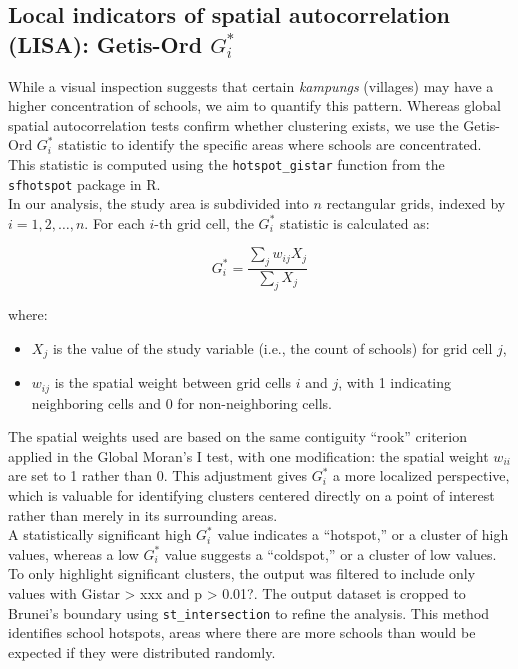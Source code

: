 \documentclass[12pt]{article}
\begin{document}
\subsection{Local indicators of spatial autocorrelation (LISA): Getis-Ord \( G_i^* \)}
While a visual inspection suggests that certain \textit{kampungs} (villages) may have a higher concentration of schools, we aim to quantify this pattern. Whereas global spatial autocorrelation tests confirm whether clustering exists, we use the Getis-Ord \( G_i^* \) statistic to identify the specific areas where schools are concentrated. This statistic is computed using the \texttt{hotspot\_gistar} function from the \texttt{sfhotspot} package in R. \\

In our analysis, the study area is subdivided into \( n \) rectangular grids, indexed by \( i = 1, 2, \dots, n \). For each \( i \)-th grid cell, the \( G_i^* \) statistic is calculated as:

\begin{equation}
G_i^* = \frac{\sum_j w_{ij} X_j}{\sum_j X_j}
\end{equation}

where:
\begin{itemize}
    \item \( X_j \) is the value of the study variable (i.e., the count of schools) for grid cell \( j \),
    \item \( w_{ij} \) is the spatial weight between grid cells \( i \) and \( j \), with 1 indicating neighboring cells and 0 for non-neighboring cells.
\end{itemize}

The spatial weights used are based on the same contiguity “rook” criterion applied in the Global Moran’s I test, with one modification: the spatial weight \( w_{ii} \) are set to 1 rather than 0. This adjustment gives \( G_i^* \) a more localized perspective, which is valuable for identifying clusters centered directly on a point of interest rather than merely in its surrounding areas. \\

A statistically significant high \( G_i^* \) value indicates a “hotspot,” or a cluster of high values, whereas a low \( G_i^* \) value suggests a “coldspot,” or a cluster of low values. \\

To only highlight significant clusters, the output was filtered to include only values with Gistar > xxx and p > 0.01?. The output dataset is cropped to Brunei’s boundary using \texttt{st\_intersection} to refine the analysis. This method identifies school hotspots, areas where there are more schools than would be expected if they were distributed randomly. \\
\end{document}
